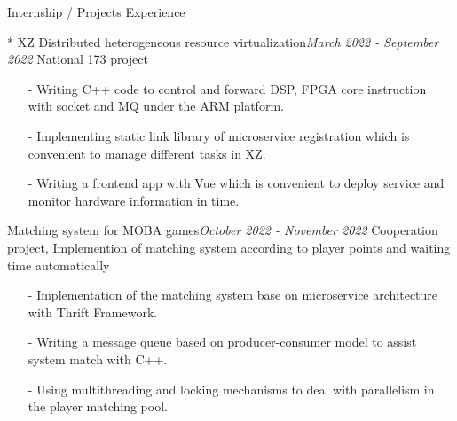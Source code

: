 \documentclass{resume} %
\begin{document}
\begin{rSection}{Internship / Projects Experience}

\begin{rSubsection}{* XZ Distributed heterogeneous resource virtualization}{\em March 2022 - September 2022}
{National 173 project}
{}
    \item[]
    \begin{itemize}
    \setlength\itemsep{-0.5em}
        \item[-] Writing C++ code to control and forward DSP, FPGA core instruction with socket and MQ under the ARM platform.
        \item[-] Implementing static link library of microservice registration which is convenient to manage different tasks in XZ.
        \item[-] Writing a frontend app with Vue which is convenient to deploy service and monitor hardware information in time.
    \end{itemize}
\end{rSubsection}


\begin{rSubsection}{Matching system for MOBA games}{\em October 2022 - November 2022}
{Cooperation project, Implemention of matching system according to player points and waiting time automatically}
{}
    \item[]
    \begin{itemize}
    \setlength\itemsep{-0.5em}
        \item[-] Implementation of the matching system base on microservice architecture with Thrift Framework.
        \item[-] Writing a message queue based on producer-consumer model to assist system match with C++.
        \item[-] Using multithreading and locking mechanisms to deal with parallelism in the player matching pool.
    \end{itemize}
\end{rSubsection}

\end{rSection}
\end{document}
